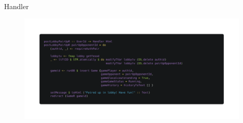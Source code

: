 \documentclass{beamer}
\begin{document}
\begin{frame}
\begin{columns}
\end{columns}

\end{frame}

\begin{frame}{Handler}
\begin{figure}
\includegraphics[width=\linewidth]{lobby}
\end{figure}
\end{frame}
\end{document}
